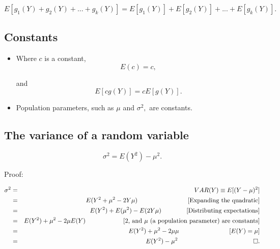 \documentclass[11pt]{article}
\begin{document}
\begin{equation*}
E[g_{1}(Y)+g_{2}(Y)+...+g_{k}(Y)]=E[g_{1}(Y)]+E[g_{2}(Y)]+...+E[g_{k}(Y)].
\end{equation*}%
\bigskip

\subsection{Constants\protect\bigskip}

\begin{itemize}
\item Where $c$ is a constant,%
\begin{equation*}
E(c)=c,
\end{equation*}

and%
\begin{equation*}
E[cg(Y)]=cE[g(Y)].
\end{equation*}

\item Population parameters, such as $\mu $ and $\sigma ^{2},$ are
constants.\bigskip 
\end{itemize}

\subsection{The variance of a random variable}

\medskip \bigskip

\begin{equation*}
\sigma ^{2}=E(Y^{2})-\mu ^{2}.
\end{equation*}

Proof:

\begin{eqnarray*}
\sigma ^{2} &=&VAR(Y)\equiv E[(Y-\mu )^{2}] \\
&=&E(Y^{2}+\mu ^{2}-2Y\mu )\text{ \ \ \ \ \ \ \ \ \ \ \ \ \ \ \ \ \ \ \ \ \
\ \ [Expanding the quadratic]} \\
&=&E(Y^{2})+E(\mu ^{2})-E(2Y\mu )\text{ \ \ \ \ \ \ \ \ \ \ \ [Distributing
expectations]} \\
&=&E(Y^{2})+\mu ^{2}-2\mu E(Y)\text{ \ \ \ \ \ \ \ \ \ \ \ \ \ \ \ \ \ [}2%
\text{, and }\mu \text{ (a population parameter) are constants]} \\
&=&E(Y^{2})+\mu ^{2}-2\mu \mu \text{ \ \ \ \ \ \ \ \ \ \ \ \ \ \ \ \ \ \ \ \
\ \ \ [}E(Y)=\mu \text{]} \\
&=&E(Y^{2})-\mu ^{2}\text{ \ \ \ \ \ \ \ \ \ \ \ \ \ \ \ \ \ \ \ \ \ \ \ \ \
\ \ \ \ \ \ \ \ \ \ }\square .
\end{eqnarray*}
\end{document}
